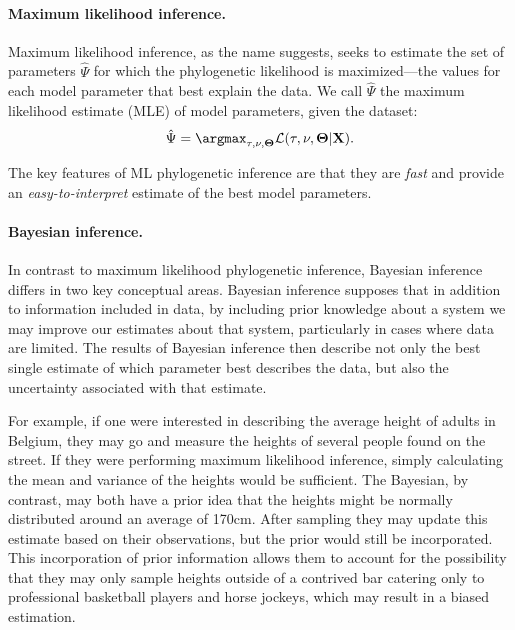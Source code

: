 \paragraph*{Maximum likelihood inference.}
Maximum likelihood inference, as the name suggests, seeks to estimate the set of parameters $\hat{\Psi}$ for which the phylogenetic likelihood is maximized---the values for each model parameter that best explain the data.
We call $\hat{\Psi}$ the maximum likelihood estimate (MLE) of model parameters, given the dataset:
\begin{equation}
  \hat{\Psi} = \argmax_{\tau,\mathbf{\nu},\mathbf{\Theta}} \mathcal{L}(\tau, \mathbf{\nu},\mathbf{\Theta} | \mathbf{X}).
\end{equation}

The key features of ML phylogenetic inference are that they are \textit{fast} and provide an \textit{easy-to-interpret} estimate of the best model parameters.

\paragraph*{Bayesian inference.}
In contrast to maximum likelihood phylogenetic inference, Bayesian inference differs in two key conceptual areas.
Bayesian inference supposes that in addition to information included in data, by including prior knowledge about a system we may improve our estimates about that system, particularly in cases where data are limited.
The results of Bayesian inference then describe not only the best single estimate of which parameter best describes the data, but also the uncertainty associated with that estimate.

For example, if one were interested in describing the average height of adults in Belgium, they may go and measure the heights of several people found on the street.
If they were performing maximum likelihood inference, simply calculating the mean and variance of the heights would be sufficient.
The Bayesian, by contrast, may both have a prior idea that the heights might be normally distributed around an average of 170cm.
After sampling they may update this estimate based on their observations, but the prior would still be incorporated.
This incorporation of prior information allows them to account for the possibility that they may only sample heights outside of a contrived bar catering only to professional basketball players and horse jockeys, which may result in a biased estimation.

